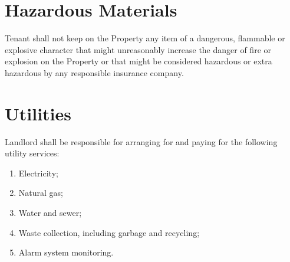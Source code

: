\documentclass{amsart}
\begin{document}
\section{Hazardous Materials}
Tenant shall not keep on the Property any item of a dangerous, flammable or
explosive character that might unreasonably increase the danger of fire or
explosion on the Property or that might be considered hazardous or extra
hazardous by any responsible insurance company.
\section{Utilities}
Landlord shall be responsible for arranging for and paying for the following
utility services:
\begin{enumerate}
    \item Electricity;
    \item Natural gas;
    \item Water and sewer;
    \item Waste collection, including garbage and recycling;
    \item Alarm system monitoring.
\end{enumerate}
\end{document}

